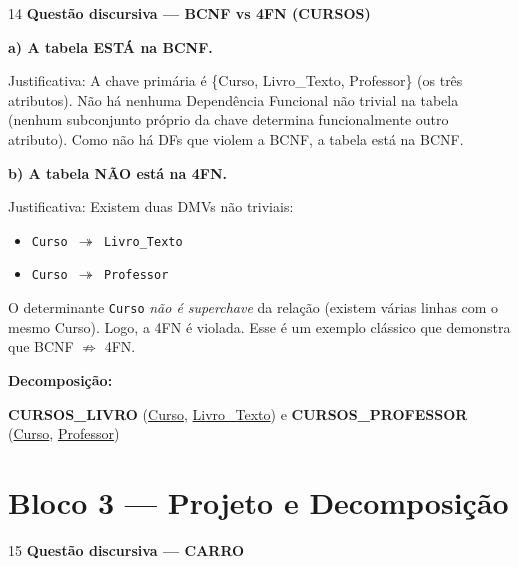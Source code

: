 \documentclass[12pt]{article}
\begin{document}
\vspace{0.5cm}

\begin{gabbox}{14}
\textbf{Questão discursiva — BCNF vs 4FN (CURSOS)}
\end{gabbox}

\begin{respdisc}
\textbf{a) A tabela ESTÁ na BCNF.}

Justificativa: A chave primária é \{Curso, Livro\_Texto, Professor\} (os três atributos). Não há nenhuma Dependência Funcional não trivial na tabela (nenhum subconjunto próprio da chave determina funcionalmente outro atributo). Como não há DFs que violem a BCNF, a tabela está na BCNF.

\medskip
\textbf{b) A tabela NÃO está na 4FN.}

Justificativa: Existem duas DMVs não triviais:
\begin{itemize}
  \item \texttt{Curso $\twoheadrightarrow$ Livro\_Texto}
  \item \texttt{Curso $\twoheadrightarrow$ Professor}
\end{itemize}
O determinante \texttt{Curso} \emph{não é superchave} da relação (existem várias linhas com o mesmo Curso). Logo, a 4FN é violada. Esse é um exemplo clássico que demonstra que BCNF $\not\Rightarrow$ 4FN.

\medskip
\textbf{Decomposição:}

\textbf{CURSOS\_LIVRO} (\underline{Curso}, \underline{Livro\_Texto}) \quad e \quad \textbf{CURSOS\_PROFESSOR} (\underline{Curso}, \underline{Professor})
\end{respdisc}

\vspace{0.5cm}

\section*{Bloco 3 — Projeto e Decomposição}

\begin{gabbox}{15}
\textbf{Questão discursiva — CARRO}
\end{gabbox}
\end{document}
